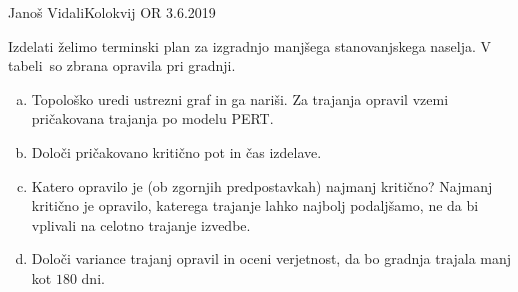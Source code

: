 \begin{naloga}{Janoš Vidali}{Kolokvij OR 3.6.2019}
\begin{vprasanje}
Izdelati želimo terminski plan za izgradnjo manjšega stanovanjskega naselja.
V tabeli~\tab so zbrana opravila pri gradnji.

\begin{enumerate}[(a)]
\item Topološko uredi ustrezni graf in ga nariši.
Za trajanja opravil vzemi pričakovana trajanja po modelu PERT.

\item Določi pričakovano kritično pot in čas izdelave.

\item Katero opravilo je (ob zgornjih predpostavkah) najmanj kritično?
Najmanj kritično je opravilo, katerega trajanje lahko najbolj podaljšamo,
ne da bi vplivali na celotno trajanje izvedbe.

\item Določi variance trajanj opravil in oceni ve\-rjet\-nost,
da bo grad\-nja trajala manj kot $180$ dni.
\end{enumerate}
%
\begin{tabela}
\end{tabela}
\end{vprasanje}


\end{naloga}
